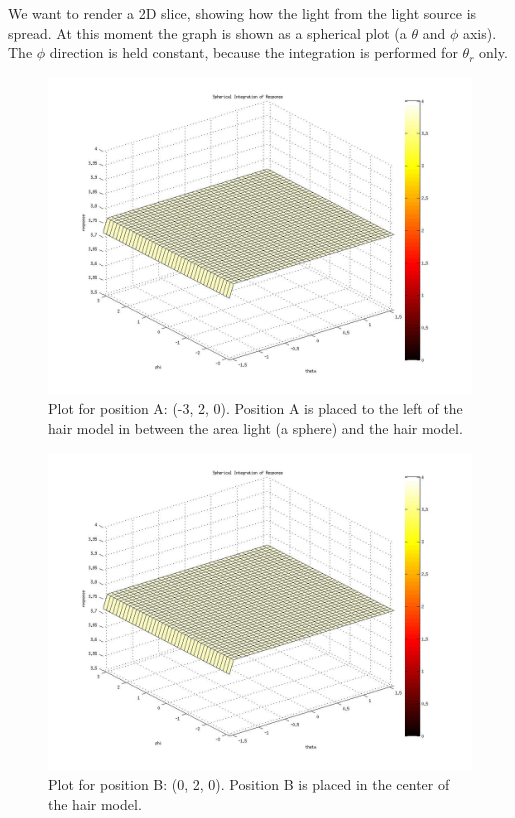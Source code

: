 \documentclass[11pt,a4paper]{article}
\begin{document}
We want to render a 2D slice, showing how the light from the light source is spread. At this moment the graph is shown as a spherical plot (a $\theta$ and $\phi$ axis). The $\phi$ direction is held constant, because the integration is performed for $\theta_r$ only.

\begin{figure}
\begin{center}
\includegraphics[scale=0.3]{outputA.jpg}
\caption{Plot for position A: (-3, 2, 0). Position A is placed to the left of the hair model in between the area light (a sphere) and the hair model.}
\end{center}
\end{figure}

\begin{figure}
\begin{center}
\includegraphics[scale=0.3]{outputB.jpg}
\caption{Plot for position B: (0, 2, 0). Position B is placed in the center of the hair model.}
\end{center}
\end{figure}
\end{document}
